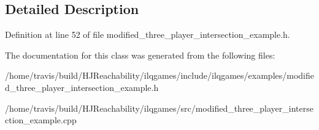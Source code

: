 \subsection{Detailed Description}


Definition at line 52 of file modified\+\_\+three\+\_\+player\+\_\+intersection\+\_\+example.\+h.



The documentation for this class was generated from the following files\+:\begin{DoxyCompactItemize}
\item 
/home/travis/build/\+H\+J\+Reachability/ilqgames/include/ilqgames/examples/modified\+\_\+three\+\_\+player\+\_\+intersection\+\_\+example.\+h\item 
/home/travis/build/\+H\+J\+Reachability/ilqgames/src/modified\+\_\+three\+\_\+player\+\_\+intersection\+\_\+example.\+cpp\end{DoxyCompactItemize}
